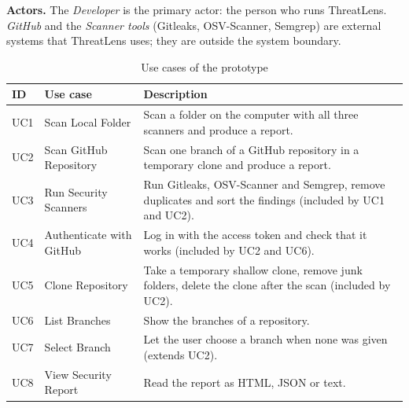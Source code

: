 \documentclass[12pt,a4paper]{article}
\begin{document}
\textbf{Actors.} The \emph{Developer} is the primary actor: the person who runs ThreatLens. \emph{GitHub} and the \emph{Scanner tools} (Gitleaks, OSV-Scanner, Semgrep) are external systems that ThreatLens uses; they are outside the system boundary.

\begin{table}[H]
\centering
\caption{Use cases of the prototype}
\label{tab:usecases}
\begin{tabularx}{\textwidth}{@{}p{1.1cm}p{4.2cm}X@{}}
\toprule
\textbf{ID} & \textbf{Use case} & \textbf{Description} \\
\midrule
UC1 & Scan Local Folder & Scan a folder on the computer with all three scanners and produce a report. \\
UC2 & Scan GitHub Repository & Scan one branch of a GitHub repository in a temporary clone and produce a report. \\
UC3 & Run Security Scanners & Run Gitleaks, OSV-Scanner and Semgrep, remove duplicates and sort the findings (included by UC1 and UC2). \\
UC4 & Authenticate with GitHub & Log in with the access token and check that it works (included by UC2 and UC6). \\
UC5 & Clone Repository & Take a temporary shallow clone, remove junk folders, delete the clone after the scan (included by UC2). \\
UC6 & List Branches & Show the branches of a repository. \\
UC7 & Select Branch & Let the user choose a branch when none was given (extends UC2). \\
UC8 & View Security Report & Read the report as HTML, JSON or text. \\
\bottomrule
\end{tabularx}
\end{table}
\end{document}
